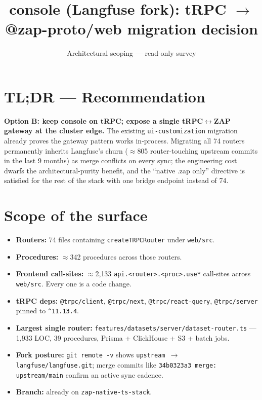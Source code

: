 \documentclass[11pt,letterpaper]{article}
\title{\textbf{console (Langfuse fork): tRPC $\rightarrow$ @zap-proto/web migration decision}}
\author{Architectural scoping --- read-only survey}
\date{}
\begin{document}
\maketitle

\section*{TL;DR --- Recommendation}
\textbf{Option B: keep console on tRPC; expose a single tRPC$\leftrightarrow$ZAP gateway at the cluster edge.} The existing \texttt{ui-customization} migration already proves the gateway pattern works in-process. Migrating all 74 routers permanently inherits Langfuse's churn ($\approx$805 router-touching upstream commits in the last 9 months) as merge conflicts on every sync; the engineering cost dwarfs the architectural-purity benefit, and the ``native .zap only'' directive is satisfied for the rest of the stack with one bridge endpoint instead of 74.

\section{Scope of the surface}
\begin{itemize}[leftmargin=1.2em,itemsep=2pt]
  \item \textbf{Routers:} 74 files containing \texttt{createTRPCRouter} under \texttt{web/src}.
  \item \textbf{Procedures:} $\approx$342 procedures across those routers.
  \item \textbf{Frontend call-sites:} $\approx$2{,}133 \texttt{api.<router>.<proc>.use*} call-sites across \texttt{web/src}. Every one is a code change.
  \item \textbf{tRPC deps:} \texttt{@trpc/client}, \texttt{@trpc/next}, \texttt{@trpc/react-query}, \texttt{@trpc/server} pinned to \texttt{\^{}11.13.4}.
  \item \textbf{Largest single router:} \texttt{features/datasets/server/dataset-router.ts} --- 1{,}933 LOC, 39 procedures, Prisma + ClickHouse + S3 + batch jobs.
  \item \textbf{Fork posture:} \texttt{git remote -v} shows \texttt{upstream $\rightarrow$ langfuse/langfuse.git}; merge commits like \texttt{34b0323a3 merge: upstream/main} confirm an active sync cadence.
  \item \textbf{Branch:} already on \texttt{zap-native-ts-stack}.
\end{itemize}
\end{document}
